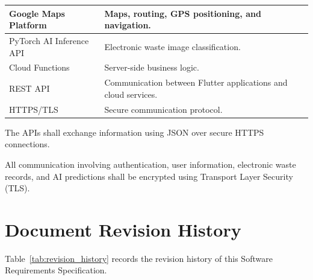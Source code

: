 \begin{longtable}{|p{5cm}|p{8cm}|}
\\

\hline

Google Maps Platform

&

Maps, routing, GPS positioning, and navigation.

\\

\hline

PyTorch AI Inference API

&

Electronic waste image classification.

\\

\hline

Cloud Functions

&

Server-side business logic.

\\

\hline

REST API

&

Communication between Flutter applications and cloud services.

\\

\hline

HTTPS/TLS

&

Secure communication protocol.

\\

\hline

\end{longtable}

The APIs shall exchange information using JSON over secure HTTPS
connections.

All communication involving authentication, user information,
electronic waste records, and AI predictions shall be encrypted using
Transport Layer Security (TLS).

\section{Document Revision History}
\label{sec:revision-history}

Table~\ref{tab:revision_history} records the revision history of this
Software Requirements Specification.


